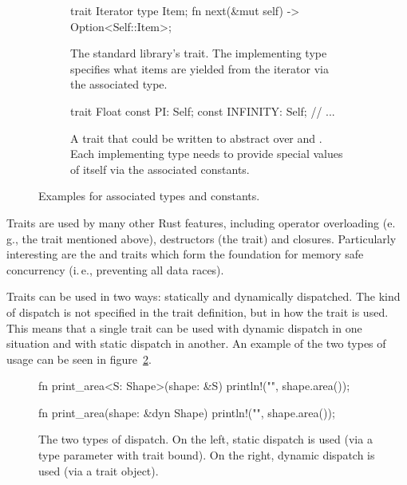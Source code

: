 \begin{figure}[b]
  \centering
    \begin{subfigure}[t]{.47\textwidth}
    \begin{rustcode}
      trait Iterator {
          type Item;
          fn next(&mut self)
              -> Option<Self::Item>;
      }
    \end{rustcode}
    \caption{
      The standard library's  trait.
      The implementing type specifies what items are yielded from the iterator via the associated type.
    }
  \end{subfigure}
  \hspace{.04\textwidth}
  \begin{subfigure}[t]{.47\textwidth}
    \begin{rustcode}
      trait Float {
          const PI: Self;
          const INFINITY: Self;
          // ...
      }
    \end{rustcode}
    \caption{
      A trait that could be written to abstract over  and .
      Each implementing type needs to provide special values of itself via the associated constants.
    }
  \end{subfigure}
  \caption{
    Examples for associated types and constants.
  }
  \label{fig:associated-type-const}
\end{figure}



Traits are used by many other Rust features, including operator overloading (e.\,g., the  trait mentioned above), destructors (the  trait) and closures.
Particularly interesting are the  and  traits which form the foundation for memory safe concurrency (i.\,e., preventing all data races).

Traits can be used in two ways: statically and dynamically dispatched.
The kind of dispatch is not specified in the trait definition, but in how the trait is used.
This means that a single trait can be used with dynamic dispatch in one situation and with static dispatch in another.
An example of the two types of usage can be seen in figure~\ref{fig:dispatch}.

\newpage
\begin{figure}[t]
  \centering
    \begin{minipage}[t]{.49\textwidth}
    \begin{rustcode}
      fn print_area<S: Shape>(shape: &S) {
          println!("{}", shape.area());
      }
    \end{rustcode}
  \end{minipage}
  \begin{minipage}[t]{.49\textwidth}
    \begin{rustcode}
      fn print_area(shape: &dyn Shape) {
          println!("{}", shape.area());
      }
    \end{rustcode}
  \end{minipage}
  \caption{
    The two types of dispatch.
    On the left, static dispatch is used (via a type parameter with trait bound).
    On the right, dynamic dispatch is used (via a trait object).
  }
  \label{fig:dispatch}
\end{figure}

